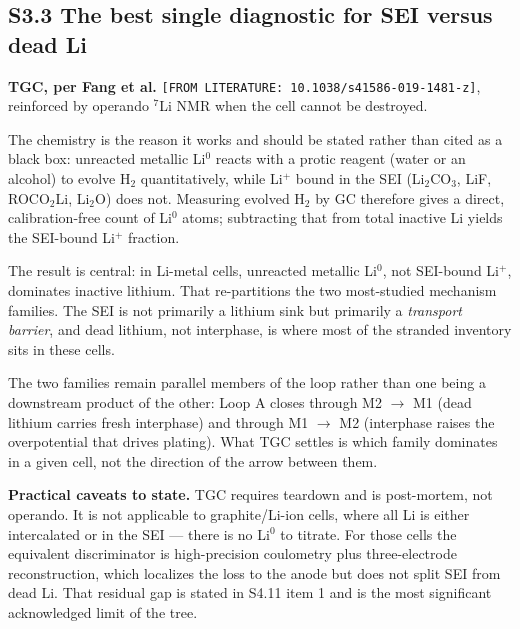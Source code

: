 \documentclass[11pt,a4paper]{article}
\begin{document}
\subsection*{S3.3 The best single diagnostic for SEI versus dead Li}


\textbf{TGC, per Fang et al.} \texttt{[FROM LITERATU}\hspace{0pt}\texttt{RE: 10.1038/}\hspace{0pt}\texttt{s41586-019-}\hspace{0pt}\texttt{1481-z]}, reinforced by operando \ensuremath{^{7}}Li NMR when the cell cannot be destroyed.


The chemistry is the reason it works and should be stated rather than cited as a black box: unreacted metallic Li\ensuremath{^{0}} reacts with a protic reagent (water or an alcohol) to evolve H\ensuremath{_{2}} quantitatively, while Li\ensuremath{^{+}} bound in the SEI (Li\ensuremath{_{2}}CO\ensuremath{_{3}}, LiF, ROCO\ensuremath{_{2}}Li, Li\ensuremath{_{2}}O) does not. Measuring evolved H\ensuremath{_{2}} by GC therefore gives a direct, calibration-free count of Li\ensuremath{^{0}} atoms; subtracting that from total inactive Li yields the SEI-bound Li\ensuremath{^{+}} fraction.


The result is central: in Li-metal cells, unreacted metallic Li\ensuremath{^{0}}, not SEI-bound Li\ensuremath{^{+}}, dominates inactive lithium. That re-partitions the two most-studied mechanism families. The SEI is not primarily a lithium sink but primarily a \emph{transport barrier}, and dead lithium, not interphase, is where most of the stranded inventory sits in these cells.


The two families remain parallel members of the loop rather than one being a downstream product of the other: Loop A closes through M2 \ensuremath{\rightarrow} M1 (dead lithium carries fresh interphase) and through M1 \ensuremath{\rightarrow} M2 (interphase raises the overpotential that drives plating). What TGC settles is which family dominates in a given cell, not the direction of the arrow between them.


\textbf{Practical caveats to state.} TGC requires teardown and is post-mortem, not operando. It is not applicable to graphite/Li-ion cells, where all Li is either intercalated or in the SEI --- there is no Li\ensuremath{^{0}} to titrate. For those cells the equivalent discriminator is high-precision coulometry plus three-electrode reconstruction, which localizes the loss to the anode but does not split SEI from dead Li. That residual gap is stated in S4.11 item 1 and is the most significant acknowledged limit of the tree.
\end{document}

